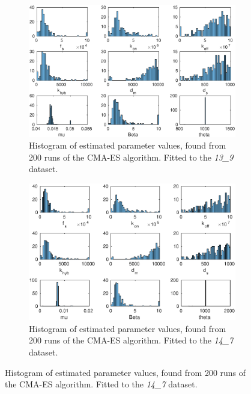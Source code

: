 \documentclass[10pt,journal]{./IEEE_latex_class/IEEEtran}
\begin{document}
 
\begin{figure}
    \begin{subfigure}[h]{0.49\textwidth}
    \centering
        \includegraphics[scale = 0.35, clip = true, trim = 80 0 80 0]{13_9_hist.eps}
        \caption{Histogram of estimated parameter values, found from 200 runs of the CMA-ES algorithm. Fitted to the \textit{13\_9} dataset. }
    \end{subfigure}
    \begin{subfigure}[c]{0.49\textwidth}
    \centering
        \includegraphics[scale = 0.38,clip = true, trim = 60 12 80 0]{14_7_hist.eps}
        \caption{Histogram of estimated parameter values, found from 200 runs of the CMA-ES algorithm. Fitted to the \textit{14\_7} dataset. }
    \end{subfigure}


\end{figure}
\end{document}
